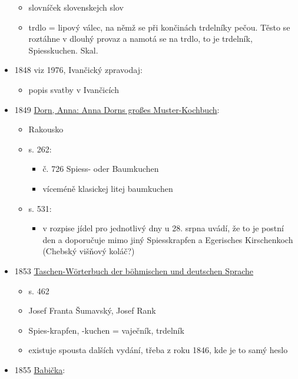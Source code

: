 \begin{itemize}
  \begin{itemize}
  \tightlist
  \item
    slovníček slovenskejch slov
  \item
    trdlo = lipový válec, na němž se při končinách trdelníky pečou.
    Těsto se roztáhne v dlouhý provaz a namotá se na trdlo, to je
    trdelník, Spiesskuchen. Skal.
  \end{itemize}
\item
  1848 viz 1976, Ivančický zpravodaj:

  \begin{itemize}
  \tightlist
  \item
    popis svatby v Ivančicích
  \end{itemize}
\item
  1849
  \href{https://www.digital.wienbibliothek.at/wbrobv/content/titleinfo/2739695}{Dorn,
  Anna: Anna Dorn\textquotesingle s großes Muster-Kochbuch}:

  \begin{itemize}
  \tightlist
  \item
    Rakousko
  \item
    s. 262:

    \begin{itemize}
    \tightlist
    \item
      č. 726 Spiess- oder Baumkuchen
    \item
      víceméně klasickej litej baumkuchen
    \end{itemize}
  \item
    s. 531:

    \begin{itemize}
    \tightlist
    \item
      v rozpise jídel pro jednotlivý dny u 28. srpna uvádí, že to je
      postní den a doporučuje mimo jiný Spiesskrapfen a Egerisches
      Kirschenkoch (Chebský višňový koláč?)
    \end{itemize}
  \end{itemize}
\item
  1853
  \href{https://www.google.cz/books/edition/Taschen_W\%C3\%B6rterbuch_der_b\%C3\%B6hmischen_und/tDlFAAAAYAAJ?hl=cs&gbpv=1&dq=trdeln\%C3\%ADk&pg=PA462&printsec=frontcover}{Taschen-Wörterbuch
  der böhmischen und deutschen Sprache}

  \begin{itemize}
  \tightlist
  \item
    s. 462
  \item
    Josef Franta Šumavský, Josef Rank
  \item
    Spies-krapfen, -kuchen = vaječník, trdelník
  \item
    existuje spousta dalších vydání, třeba z roku 1846, kde je to samý
    heslo
  \end{itemize}
\item
  1855
  \href{https://ceskadigitalniknihovna.cz/uuid/uuid:2f58bcf0-f6ae-11dd-8224-000d606f5dc6}{Babička}:


\end{itemize}
